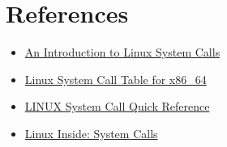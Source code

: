 \documentclass{article}
\begin{document}
\section*{References}
\begin{itemize}
	\item \href{https://hvnsweeting.github.io/syscall.html}{An Introduction to Linux System Calls}
	\item \href{https://blog.rchapman.org/posts/Linux_System_Call_Table_for_x86_64/}{Linux System Call Table for x86\_64}
	\item \href{http://www.cheat-sheets.org/saved-copy/Linux_Syscall_quickref.pdf}{LINUX System Call Quick Reference}
	\item \href{https://ia600404.us.archive.org/27/items/linux-insides/linux-insides.pdf}{Linux Inside: System Calls}
\end{itemize}
\end{document}
